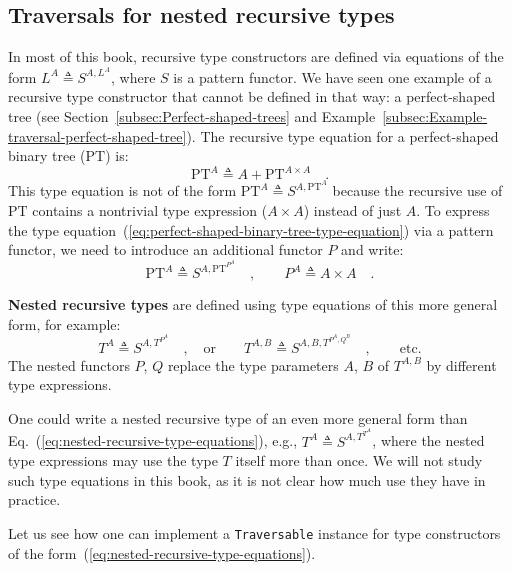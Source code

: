 \subsection{Traversals for nested recursive types}

In most of this book, recursive type constructors are defined via
equations of the form $L^{A}\triangleq S^{A,L^{A}}$, where $S$ is
a pattern functor. We have seen one example of a recursive type constructor
that cannot be defined in that way: a perfect-shaped tree (see Section~\ref{subsec:Perfect-shaped-trees}
and Example~\ref{subsec:Example-traversal-perfect-shaped-tree}).
The recursive type equation for a perfect-shaped binary tree
($\text{PT}$) is:
\begin{equation}
\text{PT}^{A}\triangleq A+\text{PT}^{A\times A}\quad.\label{eq:perfect-shaped-binary-tree-type-equation}
\end{equation}
This type equation is not of the form $\text{PT}^{A}\triangleq S^{A,\text{PT}^{A}}$
because the recursive use of $\text{PT}$ contains a nontrivial type
expression ($A\times A$) instead of just $A$. To express the type
equation~(\ref{eq:perfect-shaped-binary-tree-type-equation}) via
a pattern functor, we need to introduce an additional functor $P$
and write:
\[
\text{PT}^{A}\triangleq S^{A,\text{PT}^{P^{A}}}\quad,\quad\quad P^{A}\triangleq A\times A\quad.
\]

\textbf{Nested recursive types} are
defined using type equations of this more general form, for example:
\begin{equation}
T^{A}\triangleq S^{A,T^{P^{A}}}\quad,\quad\text{or}\quad\quad T^{A,B}\triangleq S^{A,B,T^{P^{A},Q^{B}}}\quad,\quad\quad\text{etc.}\label{eq:nested-recursive-type-equations}
\end{equation}
The nested functors $P$, $Q$ replace the type parameters $A$, $B$
of $T^{A,B}$ by different type expressions. 

One could write a nested recursive type of an even more general form
than Eq.~(\ref{eq:nested-recursive-type-equations}), e.g., $T^{A}\triangleq S^{A,T^{T^{A}}}$,
where the nested type expressions may use the type $T$ itself more
than once. We will not study such type equations in this book, as
it is not clear how much use they have in practice.

Let us see how one can implement a \lstinline!Traversable! instance
for type constructors of the form~(\ref{eq:nested-recursive-type-equations}).


